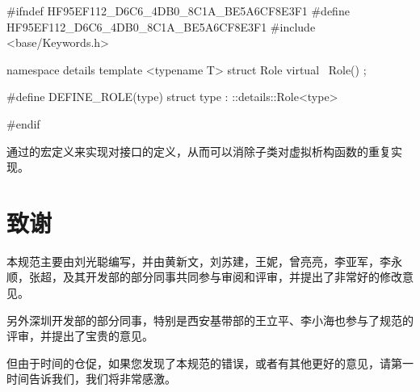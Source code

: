\begin{content}
\begin{leftbar}
\begin{c++}[caption={base/Role.h}]
#ifndef HF95EF112_D6C6_4DB0_8C1A_BE5A6CF8E3F1
#define HF95EF112_D6C6_4DB0_8C1A_BE5A6CF8E3F1
#include <base/Keywords.h>

namespace details
{
   template <typename T>
   struct Role
   {
      virtual ~Role() {}
   };
}

#define DEFINE_ROLE(type) struct type : ::details::Role<type>

#endif
\end{c++}
\end{leftbar}

通过的宏定义来实现对接口的定义，从而可以消除子类对虚拟析构函数的重复实现。

\end{content}

\section*{致谢}

\begin{content}

本规范主要由刘光聪编写，并由黄新文，刘苏建，王妮，曾亮亮，李亚军，李永顺，张超，及其开发部的部分同事共同参与审阅和评审，并提出了非常好的修改意见。

另外深圳开发部的部分同事，特别是西安基带部的王立平、李小海也参与了规范的评审，并提出了宝贵的意见。

但由于时间的仓促，如果您发现了本规范的错误，或者有其他更好的意见，请第一时间告诉我们，我们将非常感激。

\end{content}